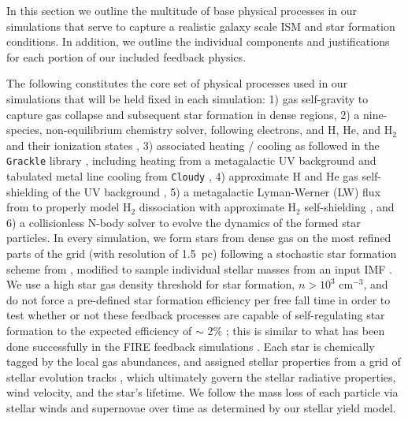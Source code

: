 \documentclass[11pt]{article}
\begin{document}
In this section we outline the multitude of base physical processes in our simulations that serve to capture a realistic galaxy scale ISM and star formation conditions. In addition, we outline the individual components and justifications for each portion of our included feedback physics.

The following constitutes the core set of physical processes used in our simulations that will be held fixed in each simulation: 1) gas self-gravity to capture gas collapse and subsequent star formation in dense regions, 2) a nine-species, non-equilibrium chemistry solver, following electrons, and H, He, and H$_{2}$ and their ionization states \citep{Anninos1997, Abel1997}, 3) associated heating / cooling as followed in the \texttt{Grackle} library \citep{Grackle}, including heating from a metagalactic UV background \citep{HM2012} and tabulated metal line cooling from \texttt{Cloudy} \citep{Cloudy2013}, 4) approximate H and He gas self-shielding of the UV background \citep{Rahmati2013}, 5) a metagalactic Lyman-Werner (LW) flux from \cite{HM2012} to properly model H$_{2}$ dissociation with approximate H$_{2}$ self-shielding \citep{Wolcott-Green2011}, and 6) a collisionless N-body solver to evolve the dynamics of the formed star particles. In every simulation, we form stars from dense gas on the most refined parts of the grid (with resolution of 1.5~pc) following a stochastic star formation scheme from \cite{Goldbaum2015, Goldbaum2016}, modified to sample individual stellar masses from an input IMF \citep[e.g.][]{Salpeter1955}. We use a high star gas density threshold for star formation, $n > 10^{3}$ cm$^{-3}$, and do not force a pre-defined star formation efficiency per free fall time in order to test whether or not these feedback processes are capable of self-regulating star formation to the expected efficiency of $\sim$ 2\% \citep{Kennicutt1998}; this is similar to what has been done successfully in the FIRE feedback simulations \citep[e.g][]{FIRE}. Each star is chemically tagged by the local gas abundances, and assigned stellar properties from a grid of stellar evolution tracks \citep{Bressan2012}, which ultimately govern the stellar radiative properties, wind velocity, and the star's lifetime. We follow the mass loss of each particle via stellar winds and supernovae over time as determined by our stellar yield model.
\end{document}
